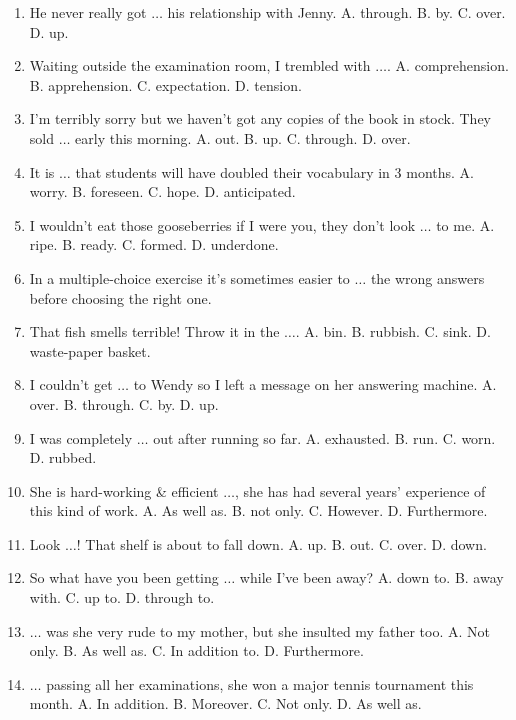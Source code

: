 \documentclass{article}
\numberwithin{equation}{section}
\begin{document}
\begin{enumerate}[leftmargin=8mm]
	\item He never really got $\ldots$ his relationship with Jenny. {\sf A.} through. {\sf B.} by. {\sf C.} over. {\sf D.} up.
	\item Waiting outside the examination room, I trembled with $\ldots$. {\sf A.} comprehension. {\sf B.} apprehension. {\sf C.} expectation. {\sf D.} tension.
	\item I'm terribly sorry but we haven't got any copies of the book in stock. They sold $\ldots$ early this morning. {\sf A.} out. {\sf B.} up. {\sf C.} through. {\sf D.} over.
	\item It is $\ldots$ that students will have doubled their vocabulary in 3 months. {\sf A.} worry. {\sf B.} foreseen. {\sf C.} hope. {\sf D.} anticipated.
	\item I wouldn't eat those gooseberries if I were you, they don't look $\ldots$ to me. {\sf A.} ripe. {\sf B.} ready. {\sf C.} formed. {\sf D.} underdone.
	\item In a multiple-choice exercise it's sometimes easier to $\ldots$ the wrong answers before choosing the right one.
	\item That fish smells terrible! Throw it in the $\ldots$. {\sf A.} bin. {\sf B.} rubbish. {\sf C.} sink. {\sf D.} waste-paper basket.
	\item I couldn't get $\ldots$ to Wendy so I left a message on her answering machine. {\sf A.} over. {\sf B.} through. {\sf C.} by. {\sf D.} up.
	\item I was completely $\ldots$ out after running so far. {\sf A.} exhausted. {\sf B.} run. {\sf C.} worn. {\sf D.} rubbed.
	\item She is hard-working \& efficient $\ldots$, she has had several years' experience of this kind of work. {\sf A.} As well as. {\sf B.} not only. {\sf C.} However. {\sf D.} Furthermore.
	\item Look $\ldots$! That shelf is about to fall down. {\sf A.} up. {\sf B.} out. {\sf C.} over. {\sf D.} down.
	\item So what have you been getting $\ldots$ while I've been away? {\sf A.} down to. {\sf B.} away with. {\sf C.} up to. {\sf D.} through to.
	\item $\ldots$ was she very rude to my mother, but she insulted my father too. {\sf A.} Not only. {\sf B.} As well as. {\sf C.} In addition to. {\sf D.} Furthermore.
	\item $\ldots$ passing all her examinations, she won a major tennis tournament this month. {\sf A.} In addition. {\sf B.} Moreover. {\sf C.} Not only. {\sf D.} As well as.

\end{enumerate}
\end{document}
